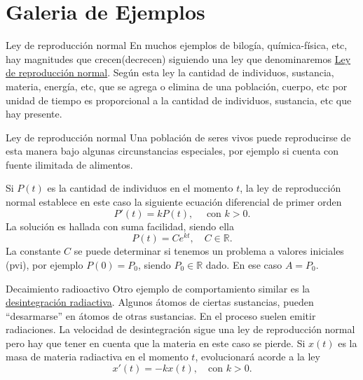 \documentclass[handout,hyperref={colorlinks=true}]{beamer}
\newcommand{\rr}{\mathbb{R}}
\newcommand{\nl}{\onslide<+-> }
\begin{document}
\section{Galeria de Ejemplos}

\begin{frame}{Ley de reproducción normal}
\nl  En muchos ejemplos de bilogía, química-física, etc, hay magnitudes que crecen(decrecen) siguiendo una ley que denominaremos 
\href{http://es.wikipedia.org/wiki/Crecimiento_exponencial}{Ley de reproducción  normal}. Según esta ley la cantidad de individuos, sustancia, materia,
energía, etc, que se agrega o elimina de una población, cuerpo, etc por unidad de tiempo es proporcional a la cantidad de individuos, sustancia, etc que hay presente.

\end{frame}

\begin{frame}{Ley de reproducción normal}
\nl  Una población de seres vivos puede reproducirse de esta manera bajo algunas circunstancias 
especiales, por ejemplo si cuenta con fuente ilimitada de alimentos.

\nl  Si $P(t)$ es la cantidad de individuos en el momento $t$, la ley de reproducción normal establece
en este caso la siguiente ecuación diferencial de primer orden
\[P'(t)=kP(t),\quad\text{ con } k>0.\]
La solución es hallada con suma facilidad, siendo ella 
\[\boxed{P(t)=Ce^{kt},\quad C\in\rr.}\]
La constante  $C$ se puede determinar si tenemos un problema a valores iniciales (pvi), por ejemplo $P(0)=P_0$, siendo $P_0\in\rr$ dado. En ese caso
$A=P_0$. 
\end{frame}

\begin{frame}{Decaimiento radioactivo}
\nl  Otro ejemplo de comportamiento similar es la \href{http://es.wikipedia.org/wiki/Radiactividad}{desintegración radiactiva}. Algunos átomos de
ciertas sustancias, pueden ``desarmarse'' en átomos de otras sustancias. En el proceso suelen emitir radiaciones.  La velocidad de desintegración sigue una ley
de reproducción normal pero hay que tener en cuenta que la materia en este caso se pierde. Si $x(t)$ es la masa de materia radiactiva en el momento $t$, evolucionará 
acorde a la ley
\[\boxed{x'(t)=-kx(t),\quad\text{con } k>0.}\]

\end{frame}
\end{document}
